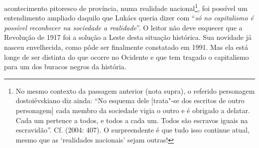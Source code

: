 acontecimento pitoresco de província, numa realidade nacional\footnote{No
  mesmo contexto da passagem anterior (nota supra), o referido
  personagem dostoiévskiano diz ainda: ``No esquema dele [trata"-se dos
  escritos de outro personagem] cada membro da sociedade vigia o outro
  e é obrigado a delatar. Cada um pertence a todos, e todos a cada um.
  Todos são escravos iguais na escravidão''. Cf.  (2004:
  407). O surpreendente é que tudo isso continue atual, mesmo que as
  `realidades nacionais' sejam outras!}, foi possível um entendimento
ampliado daquilo que Lukács queria dizer com ``\emph{só no capitalismo é
possível reconhecer na sociedade a realidade}''. O leitor não deve
esquecer que a Revolução de 1917 foi a solução a Leste desta situação
histórica. Sua novidade já nasceu envelhecida, como pôde ser finalmente
constatado em 1991. Mas ela está longe de ser distinta do que ocorre no
Ocidente e que tem tragado o capitalismo para um dos buracos negros da
história.


